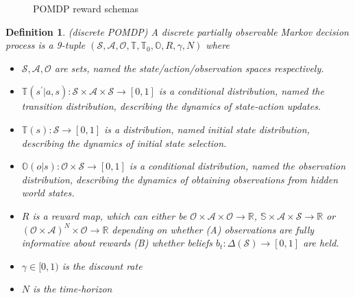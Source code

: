 \documentclass[12pt]{article}
\newtheorem{definition}{Definition}
\begin{document}
\begin{figure}[htbp]
    \caption{POMDP reward schemas}
    \label{fig:pomdp_reward_schemas}
\end{figure}

\begin{definition}(discrete POMDP)
    A discrete partially observable Markov decision process is a 9-tuple $(\mathcal{S}, \mathcal{A}, \mathcal{O}, \mathbb{T}, 
    \mathbb{T}_0, \mathbb{O}, R, \gamma, N)$ where
    \begin{itemize}
        \item $\mathcal{S}, \mathcal{A}, \mathcal{O}$ are sets, named the state/action/observation spaces respectively. 
        \item $\mathbb{T}(s^\prime | a, s): \mathcal{S} \times \mathcal{A} \times \mathcal{S} \to [0,1]$ is a conditional distribution, 
        named the transition distribution, describing the dynamics of state-action updates. 
        \item $\mathbb{T}(s): \mathcal{S} \to [0,1]$ is a distribution, named initial state distribution, describing the 
        dynamics of initial state selection.  
        \item $\mathbb{O}(o | s): \mathcal{O} \times \mathcal{S} \to [0,1]$ is a conditional distribution, named the observation 
        distribution, describing the dynamics of obtaining observations from hidden world states. 
        \item $R$ is a reward map, which can either be $\mathcal{O} \times \mathcal{A} \times \mathcal{O} \to \mathbb{R}$, 
        $\mathbb{S} \times \mathcal{A} \times \mathcal{S} \to \mathbb{R}$ or $(\mathcal{O} \times \mathcal{A})^N \times \mathcal{O} 
        \to \mathbb{R}$ depending on whether (A) observations are fully informative about rewards (B) whether beliefs $b_t: 
        \Delta(\mathcal{S}) \to [0,1]$ are held. 
        \item $\gamma \in [0,1)$ is the discount rate
        \item $N$ is the time-horizon
    \end{itemize}
\end{definition}
\end{document}
